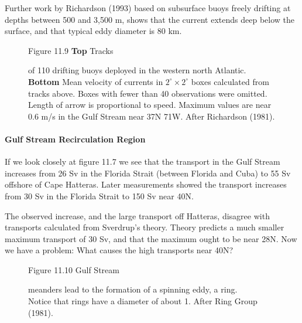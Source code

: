 Further work by Richardson (1993) based on subsurface buoys freely
drifting at depths between 500 and 3,500 m, shows that the current
extends deep below the surface, and that typical eddy diameter is 80
km.

\begin{figure}[t!]
\footnotesize
Figure 11.9 \textbf{Top} Tracks \rule{0mm}{2ex}of 110 drifting buoys
deployed in the western north Atlantic.  \textbf{Bottom} Mean velocity of currents in $2^{\circ}
\times 2^{\circ}$ boxes calculated from tracks above. Boxes with fewer
than 40 observations were omitted.  Length of arrow is proportional to
speed. Maximum values are near 0.6 m/s in the Gulf Stream near
37\degrees N 71\degrees W. After Richardson (1981).

\label{fig:drifters}
\vspace{-5ex}
\end{figure}

\paragraph{Gulf Stream Recirculation Region}
If we look closely at figure 11.7 we see
that the transport in the Gulf Stream
increases from 26 Sv in the Florida Strait (between Florida and Cuba)
to 55 Sv offshore of Cape Hatteras. Later measurements showed the
transport increases from 30 Sv in the Florida Strait to 150 Sv near
40\degrees N.

The observed increase, and the large transport off Hatteras, disagree
with transports calculated from Sverdrup's theory. Theory predicts a
much smaller maximum transport of 30 Sv, and that the maximum ought to
be near 28\degrees N.  Now we have a problem: What causes the high
transports near 40\degrees N?

\begin{figure}[t!]
\centering
\footnotesize
Figure 11.10 Gulf Stream \rule{0mm}{5ex}meanders lead to the formation
of a spinning eddy, a ring.\\Notice that rings have a diameter of
about 1\degrees. After Ring Group (1981).

\label{fig:ringformation}
\vspace{-3ex}
\end{figure}

